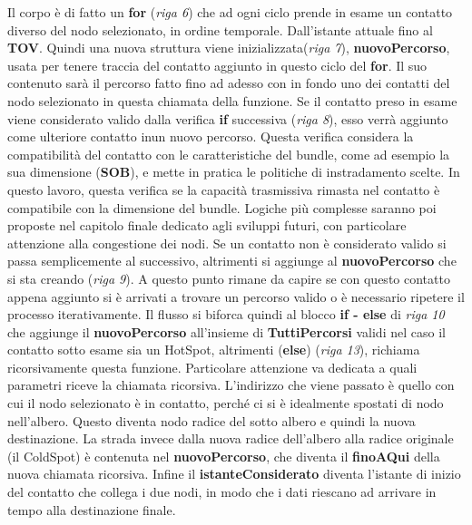 \documentclass[12pt,a4paper,oneside]{book}
\begin{document}
		Il corpo è di fatto un {\bf for} ({\it riga 6}) che ad ogni ciclo prende in esame un contatto diverso del nodo selezionato, in ordine temporale. Dall'istante attuale fino al {\bf TOV}. Quindi una nuova struttura viene inizializzata({\it riga 7}), \textbf{nuovoPercorso}, usata per tenere traccia del contatto aggiunto in questo ciclo del {\bf for}. Il suo contenuto sarà il percorso fatto fino ad adesso con in fondo uno dei contatti del nodo selezionato in questa chiamata della funzione. Se il contatto preso in esame viene considerato valido dalla verifica {\bf if} successiva ({\it riga 8}), esso verrà aggiunto come ulteriore contatto inun nuovo percorso. Questa verifica considera la compatibilità del contatto con le caratteristiche del bundle, come ad esempio la sua dimensione ({\bf SOB}), e mette in pratica le politiche di instradamento scelte. In questo lavoro, questa verifica se la capacità trasmissiva rimasta nel contatto è compatibile con la dimensione del bundle. Logiche più complesse saranno poi proposte nel capitolo finale dedicato agli sviluppi futuri, con particolare attenzione alla congestione dei nodi. Se un contatto non è considerato valido si passa semplicemente al successivo, altrimenti si aggiunge al \textbf{nuovoPercorso} che si sta creando ({\it riga 9}). A questo punto rimane da capire se con questo contatto appena aggiunto si è arrivati a trovare un percorso valido o è necessario ripetere il processo iterativamente. Il flusso si biforca quindi al blocco {\bf if - else} di {\it riga 10} che aggiunge il \textbf{nuovoPercorso} all'insieme di {\bf TuttiPercorsi} validi nel caso il contatto sotto esame sia un HotSpot, altrimenti ({\bf else}) ({\it riga 13}), richiama ricorsivamente questa funzione. Particolare attenzione va dedicata a quali parametri riceve la chiamata ricorsiva. L'indirizzo che viene passato è quello con cui il nodo selezionato è in contatto, perché ci si è idealmente spostati di nodo nell'albero. Questo diventa nodo radice del sotto albero e quindi la nuova destinazione. La strada invece dalla nuova radice dell'albero alla radice originale (il ColdSpot) è contenuta nel \textbf{nuovoPercorso}, che diventa il {\bf finoAQui} della nuova chiamata ricorsiva. Infine il \textbf{istanteConsiderato} diventa l'istante di inizio del contatto che collega i due nodi, in modo che i dati riescano ad arrivare in tempo alla destinazione finale. 
		
\end{document}
